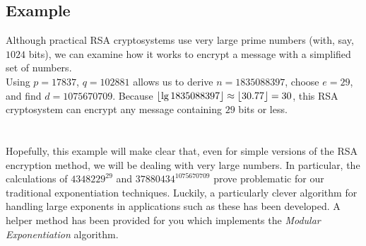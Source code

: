 		\subsection{Example}
			Although practical RSA cryptosystems use very large prime numbers (with, say, $1024$ bits), we can examine how it works to encrypt a message with a simplified set of numbers.\\

			Using $p = 17837$, $q = 102881$ allows us to derive $n = 1835088397$, choose $e = 29$, and find $d = 1075670709$. Because $\left\lfloor \lg 1835088397 \right\rfloor \approx \left\lfloor 30.77 \right\rfloor = 30$, this RSA cryptosystem can encrypt any message containing $29$ bits or less.\\[\baselineskip]
			\ \\[9pt]
			\ \\[\baselineskip]
			Hopefully, this example will make clear that, even for simple versions of the RSA encryption method, we will be dealing with very large numbers. In particular, the calculations of $4348229^{29}$ and $37880434^{1075670709}$ prove problematic for our traditional exponentiation techniques. Luckily, a particularly clever algorithm for handling large exponents in applications such as these has been developed. A helper method has been provided for you which implements the \emph{Modular Exponentiation} algorithm.

